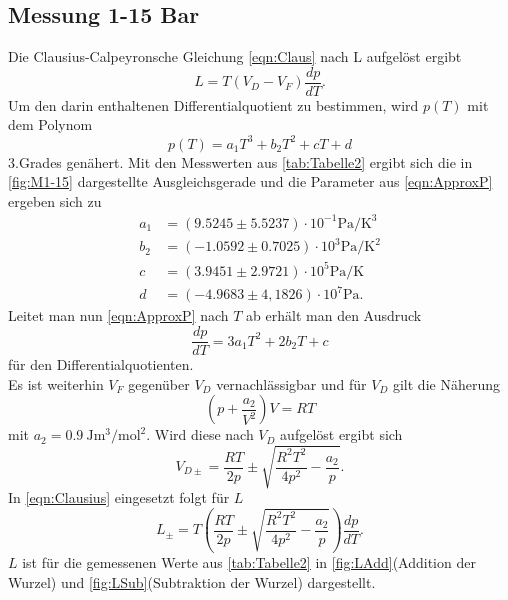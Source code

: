 \subsection{Messung 1-15 Bar}
Die Clausius-Calpeyronsche Gleichung \eqref{eqn:Claus} nach L aufgelöst ergibt
\begin{equation}
  \label{eqn:Clausius}
  L = T\left(V_D - V_F\right)\frac{dp}{dT}.
\end{equation}
Um den darin enthaltenen Differentialquotient zu bestimmen, wird $p(T)$ mit dem Polynom
\begin{equation}
  \label{eqn:ApproxP}
  p\left(T\right) = a_1T^3 + b_2T^2 + cT + d
\end{equation}
3.Grades genähert. Mit den Messwerten aus \autoref{tab:Tabelle2} ergibt sich die in \autoref{fig:M1-15} dargestellte Ausgleichsgerade
und die Parameter aus \eqref{eqn:ApproxP} ergeben sich zu
\begin{align*}
  a_1 &= (9.5245\pm 5.5237)\cdot 10^{-1}\unit{\pascal\per\cubic\kelvin} \\
  b_2 &= (-1.0592\pm 0.7025)\cdot 10^3\unit{\pascal\per\kelvin\squared} \\
  c &= (3.9451\pm 2.9721)\cdot 10^5\unit{\pascal\per\kelvin} \\
  d &= (-4.9683\pm 4,1826)\cdot 10^7\unit{\pascal}.
\end{align*}
Leitet man nun \eqref{eqn:ApproxP} nach $T$ ab erhält man den Ausdruck
\begin{equation}
  \frac{dp}{dT} = 3a_1T^2 + 2b_2T + c
\end{equation}
für den Differentialquotienten.\\
Es ist weiterhin $V_F$ gegenüber $V_D$ vernachlässigbar und für $V_D$ gilt die Näherung
\begin{equation}
  \left(p + \frac{a_2}{V^2}\right)V = RT
\end{equation}
mit $a_2 = \SI{0,9}{\joule\cubic\meter\per\mol\squared}$. Wird diese nach $V_D$ aufgelöst ergibt sich
\begin{equation}
  V_{D\pm} = \frac{RT}{2p}\pm\sqrt{\frac{R^2T^2}{4p^2}-\frac{a_2}{p}}.
\end{equation}
In \eqref{eqn:Clausius} eingesetzt folgt für $L$
\begin{equation}
  \label{eqn:LT}
  L_{\pm} = T\left(\frac{RT}{2p}\pm\sqrt{\frac{R^2T^2}{4p^2}-\frac{a_2}{p}}\right)\frac{dp}{dT}.
\end{equation}
$L$ ist für die gemessenen Werte aus \autoref{tab:Tabelle2} in \autoref{fig:LAdd}(Addition der Wurzel) und \autoref{fig:LSub}(Subtraktion der Wurzel) dargestellt.
